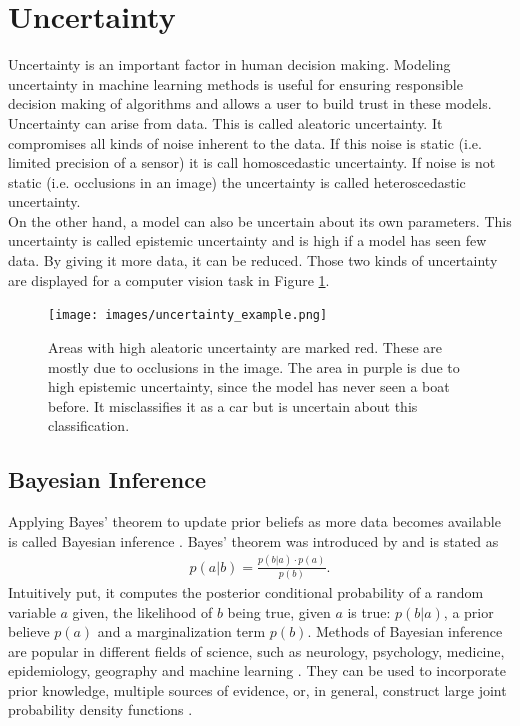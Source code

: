 \documentclass[a4paper,cleardoubleempty,BCOR1cm, 11pt]{report}
\begin{document}
\section{Uncertainty}
Uncertainty is an important factor in human decision making. Modeling uncertainty in machine learning methods is useful for ensuring responsible decision making of algorithms and allows a user to build trust in these models. Uncertainty can arise from data. This is called aleatoric uncertainty. It compromises all kinds of noise inherent to the data. If this noise is static (i.e. limited precision of a sensor) it is call homoscedastic uncertainty. If noise is not static (i.e. occlusions in an image) the uncertainty is called heteroscedastic uncertainty.\\
On the other hand, a model can also be uncertain about its own parameters. This uncertainty is called epistemic uncertainty and is high if a model has seen few data. By giving it more data, it can be reduced. Those two kinds of uncertainty are displayed for a computer vision task in Figure \ref{fig:uncertainty_example}.
\begin{figure}
	\centering
	\texttt{[image: images/uncertainty\_example.png]} 
	\caption{Areas with high aleatoric uncertainty are marked red. These are mostly due to occlusions in the image. The area in purple is due to high epistemic uncertainty, since the model has never seen a boat before. It misclassifies it as a car but is uncertain about this classification.}
	\label{fig:uncertainty_example}
\end{figure}


\subsection{Bayesian Inference}
Applying Bayes' theorem to update prior beliefs as more data becomes available is called Bayesian inference \cite{box2011bayesian}. Bayes' theorem was introduced by \citet{bayes1763lii} and is stated as
\begin{align*}
	p(a|b) = \frac{p(b|a) \cdot p(a)}{p(b)}.
\end{align*}
Intuitively put, it computes the posterior conditional probability of a random variable $a$ given, the likelihood of $b$ being true, given $a$ is true: $p(b|a)$, a prior believe $p(a)$ and a marginalization term $p(b)$. Methods of Bayesian inference are popular in different fields of science, such as neurology, psychology, medicine, epidemiology, geography and machine learning \cite{friston2002classical,wagenmakers2018bayesian,koch2006bayesian,parmigiani2002modeling,didelot2014bayesian,ghahramani2015probabilistic}. They can be used to incorporate prior knowledge, multiple sources of evidence, or, in general, construct large joint probability density functions \cite{Spiegelhalter:2009}.
\end{document}

